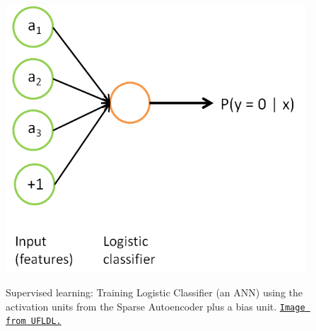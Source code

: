 \documentclass[12pt]{article}  %
\begin{document}
\begin{figure}[ht]
\begin{minipage}{.45\linewidth}
\includegraphics[scale=0.7]{images/Logistic_Classifier.png}\\
\caption{Supervised learning: Training Logistic Classifier (an ANN) using the activation units from the Sparse Autoencoder plus a bias unit. \href{http://deeplearning.stanford.edu/wiki/index.php/Self-Taught_Learning_to_Deep_Networks}{\tt Image from UFLDL.}}\label{LogisClass-fig}
\end{minipage}

\end{figure}
\end{document}
